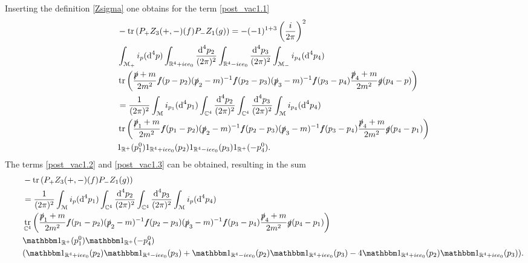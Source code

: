 \documentclass[oneside,reqno,12pt]{amsart}
\DeclareMathOperator{\tr}{tr}
\newcommand{\id}{{\mathbbm 1}}
\begin{document}
Inserting the definition \eqref{Zsigma} one obtains for the term \eqref{post_vac1.1}
\begin{align}\tag*{}
&-\tr\left(P_+ Z_3(+,-)(f) P_- Z_1(g)\right)=-(-1)^{1+3}\left(\frac{i}{2\pi}\right)^2 \\ \tag*{}
&\int_{\mathcal{M}_+}  i_p(\text{d}^4p)
  \int_{\mathbb{R}^4+i \epsilon e_0}\frac{\text{d}^4p_2}{(2\pi)^{2}} 
 \int_{\mathbb{R}^4-i \epsilon e_0}\frac{\text{d}^4p_3}{(2\pi)^{2}} 
\int_{\mathcal{M}_-}  i_{p_4}(\text{d}^4p_{4})\\\tag*{}
& 
\tr \left(\frac{\slashed{p}+m}{2m^2}
\slashed{f}(p-p_2)  (\slashed{p}_2-m)^{-1}  
\slashed{f}(p_{2}-p_3)  (\slashed{p}_3-m)^{-1}  
\slashed{f}(p_{3}-p_{4}) \frac{\slashed{p}_{4}+m}{2m^2} 
\slashed{g}(p_{4}-p)\right)\\\tag*{}
&=\frac{1}{(2\pi)^2} 
\int_{\mathcal{M}}  i_{p_1}(\text{d}^4p_1)
  \int_{\mathbb{C}^4}\frac{\text{d}^4p_2}{(2\pi)^{2}} 
 \int_{\mathbb{C}^4}\frac{\text{d}^4p_3}{(2\pi)^{2}} 
\int_{\mathcal{M}}  i_{p_4}(\text{d}^4p_{4}) \\\tag*{}
& 
\tr \left(\frac{\slashed{p}_1+m}{2m^2}
\slashed{f}(p_1-p_2)  (\slashed{p}_2-m)^{-1}  
\slashed{f}(p_{2}-p_3)  (\slashed{p}_3-m)^{-1}  
\slashed{f}(p_{3}-p_{4}) \frac{\slashed{p}_{4}+m}{2m^2} 
\slashed{g}(p_{4}-p_1)\right)\\\tag*{}
&1_{\mathbb{R}^+}(p_1^0)
1_{\mathbb{R}^4+i \epsilon e_0}(p_2)
1_{\mathbb{R}^4-i \epsilon e_0}(p_3)
1_{\mathbb{R}^+}(-p^0_4)
.\end{align}
The terms \eqref{post_vac1.2} and \eqref{post_vac1.3} can be obtained, resulting in the sum
\begin{align}
&-\tr\left(P_+ Z_3(+,-)(f) P_- Z_1(g)\right)\\
&=\frac{1}{(2\pi)^2} 
\int_{\mathcal{M}}  i_p(\text{d}^4p_1)
  \int_{\mathbb{C}^4}\frac{\text{d}^4p_2}{(2\pi)^{2}} 
 \int_{\mathbb{C}^4}\frac{\text{d}^4p_3}{(2\pi)^{2}} 
\int_{\mathcal{M}}  i_p(\text{d}^4p_{4}) \\\tag*{}
& 
\tr_{\mathbb{C}^4} \left(\frac{\slashed{p}_1+m}{2m^2}
\slashed{f}(p_1-p_2)  (\slashed{p}_2-m)^{-1}  
\slashed{f}(p_{2}-p_3)  (\slashed{p}_3-m)^{-1}  
\slashed{f}(p_{3}-p_{4}) \frac{\slashed{p}_{4}+m}{2m^2} 
\slashed{g}(p_{4}-p_1)\right)\\\tag*{}
&\id_{\mathbb{R}^+}(p_1^0)\id_{\mathbb{R}^+}(-p^0_4)\\
&(\id_{\mathbb{R}^4+i \epsilon e_0}(p_2)
\id_{\mathbb{R}^4-i \epsilon e_0}(p_3)
+ \id_{\mathbb{R}^4-i \epsilon e_0}(p_2)
\id_{\mathbb{R}^4+i \epsilon e_0}(p_3)
-4  \id_{\mathbb{R}^4+i \epsilon e_0}(p_2)
\id_{\mathbb{R}^4+i \epsilon e_0}(p_3)
)
. \end{align}
\end{document}
